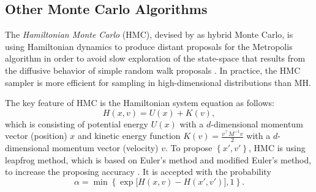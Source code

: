 %
%



\subsection*{Other Monte Carlo Algorithms}

The \textit{Hamiltonian Monte Carlo} (HMC), devised by \cite{duane1987hybrid} as hybrid Monte Carlo, is using Hamiltonian dynamics to produce distant proposals for the Metropolis algorithm in order to avoid slow exploration of the state-space that results from the diffusive behavior of simple random walk proposals \cite{neal2011mcmc}. In practice, the HMC sampler is more efficient for sampling in high-dimensional distributions than MH.

The key feature of HMC is the Hamiltonian system equation as follows: 
\begin{equation*}
H(x,v) = U(x)+K(v),
\end{equation*}
which is consisting of potential energy $U(x)$ with a $d$-dimensional momentum vector (position) $x$ and kinetic energy function $K(v)=\frac{v^\top M^{-1}v}{2}$ with a $d$-dimensional momentum vector (velocity) $v$. To propose $\left\lbrace x',v'\right\rbrace$, HMC is using leapfrog method, which is based on Euler's method and modified Euler's method, to increase the proposing accuracy \cite{betancourt2017conceptual}. It is accepted with the probability
\begin{equation*}
\alpha = \min\left\lbrace\exp\lbrack H(x,v)-H(x',v') \rbrack, 1\right\rbrace.
\end{equation*}

